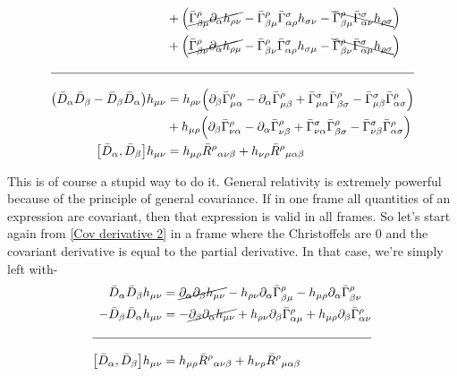 \documentclass[12pt, letterpaper]{report}
\begin{document}
\begin{align*}
    &+ \qty(\cancel{\bar{\Gamma}^{\rho}_{\beta \mu}\partial_\alpha h_{\rho\nu}}- \bar{\Gamma}^{\rho}_{\beta \mu}\bar{\Gamma}^{\sigma}_{\alpha \rho} h_{\sigma\nu}- \bcancel{\bar{\Gamma}^{\rho}_{\beta \mu}\bar{\Gamma}^{\sigma}_{\alpha \nu} h_{\rho\sigma}})\\
    &+ \qty(\cancel{\bar{\Gamma}^{\rho}_{\beta \nu}\partial_\alpha h_{\rho\mu}}- \bar{\Gamma}^{\rho}_{\beta \nu}\bar{\Gamma}^{\sigma}_{\alpha \rho} h_{\sigma\mu}- \bcancel{\bar{\Gamma}^{\rho}_{\beta \nu}\bar{\Gamma}^{\sigma}_{\alpha \mu} h_{\rho\sigma}})\\
    \noalign{\bigskip\hrule\bigskip}
    \qty(\bar{D}_\alpha \bar{D}_\beta -\bar{D}_\beta \bar{D}_\alpha){h_{\mu\nu}}&= h_{\rho\nu}\qty(\partial_\beta\bar{\Gamma}^{\rho}_{\mu \alpha}-\partial_\alpha\bar{\Gamma}^{\rho}_{\mu \beta}+ \bar{\Gamma}^{\sigma}_{\mu\alpha}\bar{\Gamma}^{\rho}_{\beta \sigma}- \bar{\Gamma}^{\sigma}_{\mu\beta}\bar{\Gamma}^{\rho}_{\alpha \sigma})\\
    &+ h_{\mu\rho}\qty(\partial_\beta \bar{\Gamma}^{\rho}_{\nu\alpha}-\partial_\alpha \bar{\Gamma}^{\rho}_{\nu\beta}+ \bar{\Gamma}^{\sigma}_{\nu\alpha}\bar{\Gamma}^{\rho}_{\beta \sigma}- \bar{\Gamma}^{\sigma}_{\nu\beta}\bar{\Gamma}^{\rho}_{\alpha \sigma} )\\
    \qty[\bar{D}_\alpha, \bar{D}_\beta]{h_{\mu\nu}}&= h_{\mu\rho}\bar{R}^{\rho}{}_{\alpha\nu\beta}+ h_{\nu\rho}\bar{R}^{\rho}{}_{\mu\alpha\beta}
\end{align*}

This is of course a stupid way to do it. General relativity is extremely powerful because of the principle of general covariance. If in one frame all quantities of an expression are covariant, then that expression is valid in all frames. So let's start again from \cref{Cov derivative 2} in a frame where the Christoffels are $0$ and the covariant derivative is equal to the partial derivative. In that case, we're simply left with- 
\begin{align*}
    \bar{D}_\alpha \bar{D}_\beta h_{\mu\nu} &= \cancel{\partial_\alpha\partial_\beta h_{\mu\nu}}- h_{\rho\nu}\partial_\alpha\bar{\Gamma}^{\rho}_{\beta \mu}- h_{\mu\rho}\partial_\alpha \bar{\Gamma}^{\rho}_{\beta \nu}\\
    -\bar{D}_\beta \bar{D}_\alpha h_{\mu\nu} &= -\cancel{\partial_\beta\partial_\alpha h_{\mu\nu}}+ h_{\rho\nu}\partial_\beta\bar{\Gamma}^{\rho}_{\alpha \mu}+ h_{\mu\rho}\partial_\beta \bar{\Gamma}^{\rho}_{\alpha \nu}\\
    \noalign{\bigskip\hrule\bigskip}
    \qty[\bar{D}_\alpha, \bar{D}_\beta]{h_{\mu\nu}}&= h_{\mu\rho}\bar{R}^{\rho}{}_{\alpha\nu\beta}+ h_{\nu\rho}\bar{R}^{\rho}{}_{\mu\alpha\beta}
\end{align*}
\end{document}
